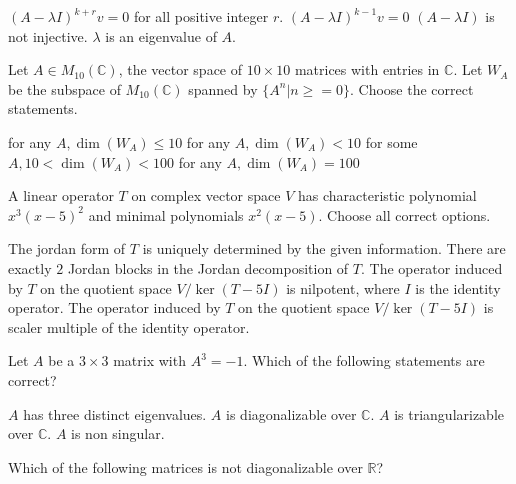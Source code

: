 \documentclass[10pt]{exam}
\begin{document}
\begin{questions}
\begin{checkboxes}
\choice $(A-\lambda I)^{k+r}v=0$ for all positive integer $r$.
\choice $(A-\lambda I)^{k-1}v=0$
\choice $(A-\lambda I)$ is not injective.
\choice $\lambda$ is an eigenvalue of $A$.
\end{checkboxes}


\question
Let $A\in M_{10}(\mathbb{C})$, the vector space of $10\times 10$ matrices with entries in $\mathbb{C}$. Let $W_A$ be the subspace of
$M_{10}(\mathbb{C})$ spanned by $\{A^n|n \geq =0\}$. Choose the correct statements.

\begin{checkboxes}
\choice for any $A, \dim(W_A)\leq 10$
\choice for any $A, \dim(W_A)< 10$
\choice for some $A, 10<\dim(W_A)< 100$
\choice for any $A, \dim(W_A)= 100$
\end{checkboxes}


\question
A linear operator $T$ on complex vector space $V$ has characteristic polynomial $x^3(x-5)^2$ and minimal polynomials $x^2(x-5)$.
Choose all correct options.

\begin{checkboxes}
\choice The jordan form of $T$ is uniquely determined by the given information.
\choice There are exactly $2$  Jordan blocks in the Jordan decomposition of $T$.
\choice The operator induced by $T$ on the quotient space $V/\ker (T-5I)$ is nilpotent, where $I$ is the identity operator.
\choice The operator induced by $T$ on the quotient space $V/\ker (T-5I)$ is scaler multiple of the identity operator.
\end{checkboxes}

\question
Let $A$ be a $3\times 3$ matrix with $A^3=-1$. Which of the following statements are correct?

\begin{checkboxes}
\choice $A$ has three distinct eigenvalues.
\choice $A$ is diagonalizable over $\mathbb{C}$.
\choice $A$ is triangularizable over $\mathbb{C}$.
\choice $A$ is non singular.
\end{checkboxes}

\question
Which of the following matrices is not diagonalizable over $\mathbb{R}$?


\end{questions}
\end{document}
